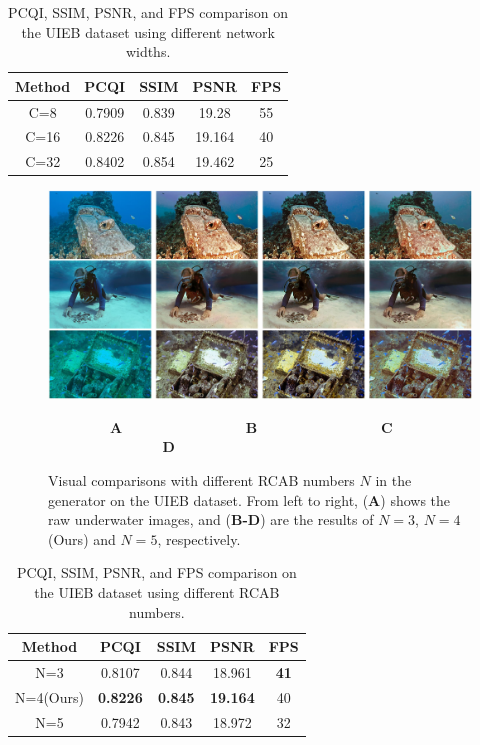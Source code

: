 \documentclass[utf8]{FrontiersinHarvard} %
\begin{document}
\begin{table}[htbp]\normalsize
\centering
\setlength\tabcolsep{13pt}
\caption{{PCQI, SSIM, PSNR, and FPS comparison on the UIEB dataset using different network widths.}}
\begin{tabular}{c|cccc}
\hline  
Method&PCQI&SSIM&PSNR&FPS\\
\hline 
C=8&0.7909&0.839&19.28&55\\ 
\hline
C=16&0.8226&0.845&19.164&40\\
\hline
C=32&0.8402&0.854&19.462&25\\
\hline 
\end{tabular}
\label{tbl:ablationchannel-UIEBD}
\end{table}

\begin{figure}[htbp]
\begin{center}
\includegraphics[width=1\textwidth]{FSpiralGAN_frontiers/onepicture/abalation_RCAB300.jpg}
\end{center}
$~~~~~~~~~~~~~~~~~~~~$\textbf{A}$~~~~~~~~~~~~~~~~~~~~~~~~~~~~~~~~~~~~~~~~$\textbf{B}$~~~~~~~~~~~~~~~~~~~~~~~~~~~~~~~~~~~~~~~~$\textbf{C}$~~~~~~~~~~~~~~~~~~~~~~~~~~~~~~~~~~~~~$\textbf{D}
 \caption{Visual comparisons with different RCAB numbers $N$ in the generator on the UIEB dataset. From left to right, (\textbf{A}) shows the raw underwater images, and (\textbf{B-D}) are the results of $N=3$, $N=4$(Ours) and $N=5$, respectively. \label{fig:ablationRCAB-UIEBD}}
\end{figure}

\begin{table}[htbp]\normalsize
\centering
\setlength\tabcolsep{13pt}
\caption{{PCQI, SSIM, PSNR, and FPS comparison on the UIEB dataset using different RCAB numbers.}}
\begin{tabular}{c|cccc}
\hline  
Method&PCQI&SSIM&PSNR&FPS\\
\hline 
N=3&0.8107&0.844&18.961&\textbf{41}\\ 
\hline
N=4(Ours)&\textbf{0.8226}&\textbf{0.845}&\textbf{19.164}&40\\
\hline
N=5&0.7942&0.843&18.972&32\\
\hline 
\end{tabular}
\label{tbl:ablationRCAB-UIEBD}
\end{table}
\end{document}
